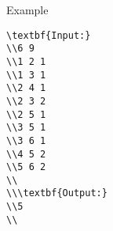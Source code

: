 Example
\begin{verbatim}
\textbf{Input:}
\\6 9
\\1 2 1
\\1 3 1
\\2 4 1
\\2 3 2
\\2 5 1
\\3 5 1
\\3 6 1
\\4 5 2
\\5 6 2
\\
\\\textbf{Output:}
\\5
\\\end{verbatim}